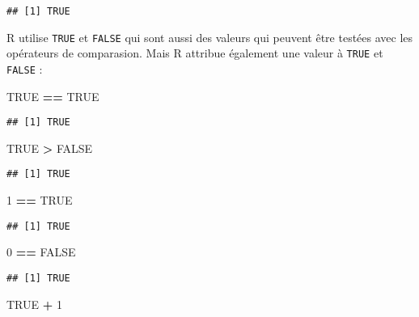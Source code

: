\documentclass[]{book}
\newenvironment{Shaded}{\begin{snugshade}}{\end{snugshade}}
\newcommand{\DecValTok}[1]{\textcolor[rgb]{0.00,0.00,0.81}{#1}}
\newcommand{\StringTok}[1]{\textcolor[rgb]{0.31,0.60,0.02}{#1}}
\newcommand{\OtherTok}[1]{\textcolor[rgb]{0.56,0.35,0.01}{#1}}
\newcommand{\OperatorTok}[1]{\textcolor[rgb]{0.81,0.36,0.00}{\textbf{#1}}}
\theoremstyle{definition}
\theoremstyle{definition}
\theoremstyle{definition}
\theoremstyle{remark}
\begin{document}
\begin{verbatim}
## [1] TRUE
\end{verbatim}

R utilise \texttt{TRUE} et \texttt{FALSE} qui sont aussi des valeurs qui
peuvent être testées avec les opérateurs de comparasion. Mais R attribue
également une valeur à \texttt{TRUE} et \texttt{FALSE} :

\begin{Shaded}
\begin{Highlighting}[]
\OtherTok{TRUE} \OperatorTok{==}\StringTok{ }\OtherTok{TRUE}
\end{Highlighting}
\end{Shaded}

\begin{verbatim}
## [1] TRUE
\end{verbatim}

\begin{Shaded}
\begin{Highlighting}[]
\OtherTok{TRUE} \OperatorTok{>}\StringTok{ }\OtherTok{FALSE}
\end{Highlighting}
\end{Shaded}

\begin{verbatim}
## [1] TRUE
\end{verbatim}

\begin{Shaded}
\begin{Highlighting}[]
\DecValTok{1} \OperatorTok{==}\StringTok{ }\OtherTok{TRUE}
\end{Highlighting}
\end{Shaded}

\begin{verbatim}
## [1] TRUE
\end{verbatim}

\begin{Shaded}
\begin{Highlighting}[]
\DecValTok{0} \OperatorTok{==}\StringTok{ }\OtherTok{FALSE}
\end{Highlighting}
\end{Shaded}

\begin{verbatim}
## [1] TRUE
\end{verbatim}

\begin{Shaded}
\begin{Highlighting}[]
\OtherTok{TRUE} \OperatorTok{+}\StringTok{ }\DecValTok{1}
\end{Highlighting}
\end{Shaded}
\end{document}
